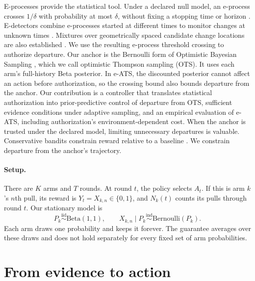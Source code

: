 \documentclass{article}
\newcommand{\method}{e-ATS}
\newcommand{\anchor}{OTS}
\newcommand{\1}{\mathbf 1}
\begin{document}
E-processes provide the statistical tool. Under a declared null model,
an e-process crosses $1/\delta$ with probability at most $\delta$, without
fixing a stopping time or horizon
\citep{ville1939,vovk2021evalues,grunwald2024safe,ramdas2023savi}. E-detectors
combine e-processes started at different times to monitor changes at unknown times
\citep{shin2023edetectors}. Mixtures over geometrically spaced candidate
change locations are also established \citep[Section~4.4]{ramdas2022exchangeability}.
We use the resulting e-process threshold crossing to authorize departure.
Our anchor is the Bernoulli form of Optimistic Bayesian
Sampling \citep{thompson1933,may2012optimistic}, which we call optimistic
Thompson sampling (\anchor{}). It uses each arm's full-history Beta posterior.
In \method{}, the discounted posterior
cannot affect an action before authorization, so the crossing bound also bounds
departure from the anchor.
Our contribution is a controller that translates statistical authorization into
prior-predictive control of departure from \anchor{}, sufficient evidence
conditions under adaptive sampling, and an empirical evaluation of
\method, including authorization's environment-dependent cost. When the anchor
is trusted under the declared model, limiting unnecessary departures is valuable.
Conservative bandits constrain reward relative to a baseline \citep{wu2016conservative}.
We constrain departure from the anchor’s trajectory.

\paragraph{Setup.}
There are $K$ arms and $T$ rounds. At round $t$, the policy selects $A_t$. If
this is arm $k$'s $n$th pull, its reward is
$Y_t=X_{k,n}\in\{0,1\}$, and $N_k(t)$ counts its pulls through round $t$. Our
stationary model is
\begin{equation}
 P_k\stackrel{\mathrm{iid}}{\sim}\mathrm{Beta}(1,1),\qquad
 X_{k,n}\mid P_k\stackrel{\mathrm{ind}}{\sim}\mathrm{Bernoulli}(P_k).
 \label{eq:null}
\end{equation}
Each arm draws one probability and keeps it forever. The guarantee averages
over these draws and does not hold separately for every fixed set of arm
probabilities.

\section{From evidence to action}
\label{sec:method}
\end{document}
